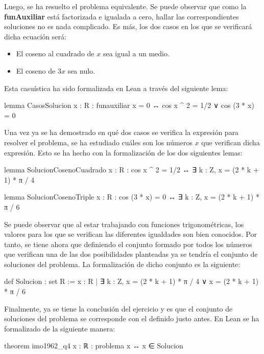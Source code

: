Luego, se ha resuelto el problema equivalente. Se puede observar que
como la \textbf{funAuxiliar} está factorizada e igualada a cero, hallar
las correspondientes soluciones no es nada complicado. Es más, los dos
casos en los que se verificará dicha ecuación será:
\begin{itemize}
\item El coseno al cuadrado de \(x\) sea igual a un medio.

\item El coseno de \(3x\) sea nulo.
\end{itemize}

Esta casuística ha sido formalizada en Lean a través del siguiente lema:
\begin{leancode}
lemma CasosSolucion
  {x : R}
  : funauxiliar x = 0 ↔ cos x ^ 2 = 1/2 ∨ cos (3 * x) = 0
\end{leancode}

Una vez ya se ha demostrado en qué dos casos se verifica la expresión
para resolver el problema, se ha estudiado cuáles son los números \(x\)
que verifican dicha expresión. Esto se ha hecho con la formalización de
los dos siguientes lemas:
\begin{leancode}
lemma SolucionCosenoCuadrado
  {x : R}
  : cos x ^ 2 = 1/2 ↔ ∃ k : Z, x = (2 * k + 1) * π / 4

lemma SolucionCosenoTriple
  {x : R}
  : cos (3 * x) = 0 ↔ ∃ k : Z, x = (2 * k + 1) * π / 6
\end{leancode}

Se puede observar que al estar trabajando con funciones trigonométricas,
los valores para los que se verifican las diferentes igualdades son bien
conocidos.  Por tanto, se tiene ahora que definiendo el conjunto formado
por todos los números que verifican una de las dos posibilidades
planteadas ya se tendría el conjunto de soluciones del problema. La
formalización de dicho conjunto es la siguiente:
\begin{leancode}
def Solucion : set R :=
  {x : R | ∃ k : Z, x = (2 * k + 1) * π / 4 ∨ x = (2 * k + 1) * π / 6}
\end{leancode}

Finalmente, ya se tiene la conclusión del ejercicio y es que el conjunto
de soluciones del problema se corresponde con el definido justo
antes. En Lean se ha formalizado de la siguiente manera:

\begin{leancode}
theorem imo1962_q4
  {x : ℝ}
  : problema x ↔ x ∈ Solucion
\end{leancode}


